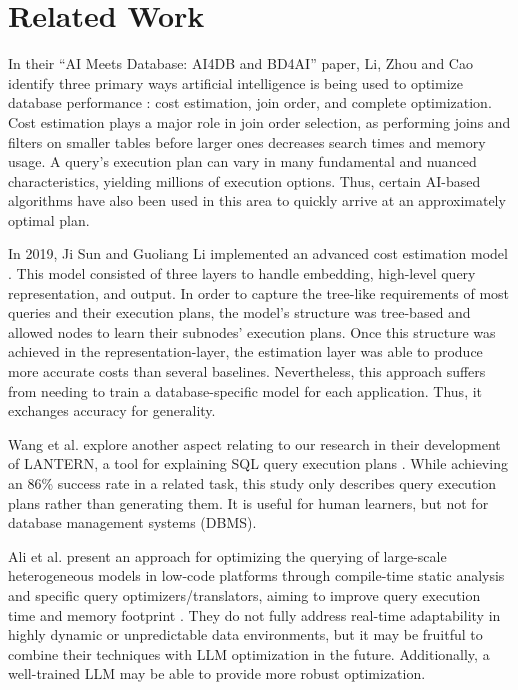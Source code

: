 \section{Related Work}
In their ``AI Meets Database: AI4DB and BD4AI'' paper, Li, Zhou and Cao identify three primary ways artificial intelligence is being used to optimize database performance \cite{li2021}: cost estimation, join order, and complete optimization. Cost estimation plays a major role in join order selection, as performing joins and filters on smaller tables before larger ones decreases search times and memory usage. A query's execution plan can vary in many fundamental and nuanced characteristics, yielding millions of execution options. Thus, certain AI-based algorithms have also been used in this area to quickly arrive at an approximately optimal plan.

In 2019, Ji Sun and Guoliang Li implemented an advanced cost estimation model \cite{sun2019}. This model consisted of three layers to handle embedding, high-level query representation, and output. In order to capture the tree-like requirements of most queries and their execution plans, the model's structure was tree-based and allowed nodes to learn their subnodes' execution plans. Once this structure was achieved in the representation-layer, the estimation layer was able to produce more accurate costs than several baselines. Nevertheless, this approach suffers from needing to train a database-specific model for each application. Thus, it exchanges accuracy for generality.

Wang et al. explore another aspect relating to our research in their development of LANTERN, a tool for explaining SQL query execution plans \cite{wang2021}. While achieving an 86\% success rate in a related task, this study only describes query execution plans rather than generating them. It is useful for human learners, but not for database management systems (DBMS).

Ali et al. present an approach for optimizing the querying of large-scale heterogeneous models in low-code platforms through compile-time static analysis and specific query optimizers/translators, aiming to improve query execution time and memory footprint \cite{Ali2020EfficientlyQM}. They do not fully address real-time adaptability in highly dynamic or unpredictable data environments, but it may be fruitful to combine their techniques with LLM optimization in the future. Additionally, a well-trained LLM may be able to provide more robust optimization.

